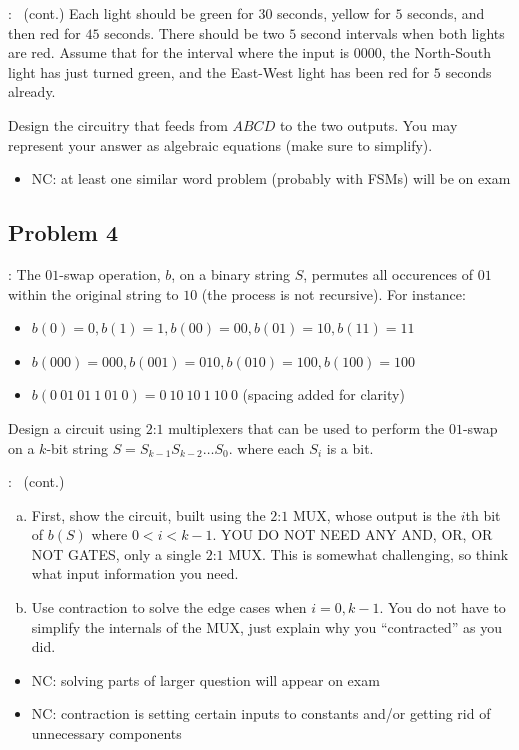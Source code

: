 \documentclass{../slides}
\begin{document}
\begin{frame}{\secname: \subsecname\ (cont.)}
    Each light should be green for $30$ seconds, yellow for $5$ seconds, and then red for $45$ seconds. There should be two $5$ second intervals when both lights are red. Assume that for the interval where the input is $0000$, the North-South light has just turned green, and the East-West light has been red for $5$ seconds already.

    Design the circuitry that feeds from $ABCD$ to the two outputs. You may represent your answer as algebraic equations (make sure to simplify).
    \begin{itemize}
        \item NC: at least one similar word problem (probably with FSMs) will be on exam
    \end{itemize}
\end{frame}

\subsection{Problem 4}
\begin{frame}{\secname: \subsecname}
    The $01$-swap operation, $b$, on a binary string $S$, permutes all occurences of $01$ within the original string to $10$ (the process is not recursive). For instance:
    \begin{itemize}
        \item $b(0) = 0, b(1) = 1, b(00) = 00, b(01) = 10, b(11) = 11$
        \item $b(000) = 000, b(001) = 010, b(010) = 100, b(100) = 100$
        \item $b(0\ 01\ 01\ 1\ 01\ 0) = 0\ 10\ 10\ 1\ 10\ 0$ (spacing added for clarity)
    \end{itemize}
    Design a circuit using $2$:$1$ multiplexers that can be used to perform the $01$-swap on a $k$-bit string $S = S_{k-1}S_{k-2}\dots S_0$. where each $S_i$ is a bit.
\end{frame}

\begin{frame}{\secname: \subsecname\ (cont.)}
    \begin{enumerate}[(a)]
        \item First, show the circuit, built using the $2$:$1$ MUX, whose output is the $i$th bit of $b(S)$ where $0 < i < k - 1$. YOU DO NOT NEED ANY AND, OR, OR NOT GATES, only a single $2$:$1$ MUX. This is somewhat challenging, so think what input information you need.
        \item Use contraction to solve the edge cases when $i = 0, k - 1$. You do not have to simplify the internals of the MUX, just explain why you \enquote{contracted} as you did.
    \end{enumerate}
    \begin{itemize}
        \item NC: solving parts of larger question will appear on exam
        \item NC: contraction is setting certain inputs to constants and/or getting rid of unnecessary components
    \end{itemize}
\end{frame}
\end{document}
